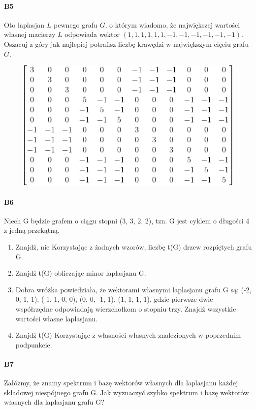 \documentclass[a4paper,12pt]{article}
\theoremstyle{definition}%
\theoremstyle{definition}
\theoremstyle{problem}
\begin{document}
\paragraph{B5} Oto laplasjan $L$ pewnego grafu $G$, o którym wiadomo, że największej wartości własnej macierzy $L$ odpowiada wektor $(1, 1, 1, 1, 1, 1, -1, -1, -1, -1, -1, -1)$. Oszacuj z góry jak najlepiej potrafisz liczbę krawędzi w największym cięciu grafu $G$.
\begin{figure}[H]
\centering
\includegraphics[width=.9\textwidth]{img/5_B5}
\end{figure}

\paragraph{B6} Niech G będzie grafem o ciągu stopni (3, 3, 2, 2), tzn. G jest cyklem o długości 4 z jedną przekątną.
\begin{enumerate}[label=\alph*)]
\item Znajdź, nie Korzystając z żadnych wzorów, liczbę t(G) drzew rozpiętych grafu G.
\item Znajdź t(G) obliczając minor laplasjanu G.
\item Dobra wróżka powiedziała, że wektorami własnymi laplasjanu grafu G są: (-2, 0, 1, 1), (-1, 1, 0, 0), (0, 0, -1, 1), (1, 1, 1, 1), gdzie pierwsze dwie współrzędne odpowiadają wierzchołkom o stopniu trzy. Znajdź wszystkie wartości własne laplasjanu.
\item Znajdź t(G) Korzystając z własności własnych znalezionych w poprzednim podpunkcie.
\end{enumerate}

\paragraph{B7} Załóżmy, że znamy spektrum i bazę wektorów własnych dla laplasjanu każdej składowej niespójnego grafu G. Jak wyznaczyć szybko spektrum i bazę wektorów własnych dla laplasjanu grafu G?
\end{document}
